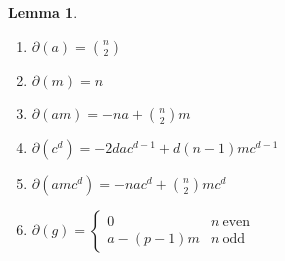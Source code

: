 \documentclass[10pt,a4paper]{amsart}
\newtheorem{lemma}{Lemma}
\begin{document}
\begin{lemma}\label{lem:PartialIdentities}

    \begin{enumerate}
        \item $\partial(a) = \binom{n}{2}$
        \item $\partial(m) = n$
        \item $\partial(am) = -na + \binom{n}{2}m$
        \item $\partial(c^d) = -2dac^{d-1} + d(n-1)mc^{d-1}$
        \item $\partial(amc^d) = -nac^d + \binom{n}{2}mc^d$
        \item $\partial(g) = \begin{cases}
            0 & n~\text{even}\\
            a - (p-1)m& n~\text{odd}
        \end{cases}$
    \end{enumerate}
\end{lemma}
\end{document}
